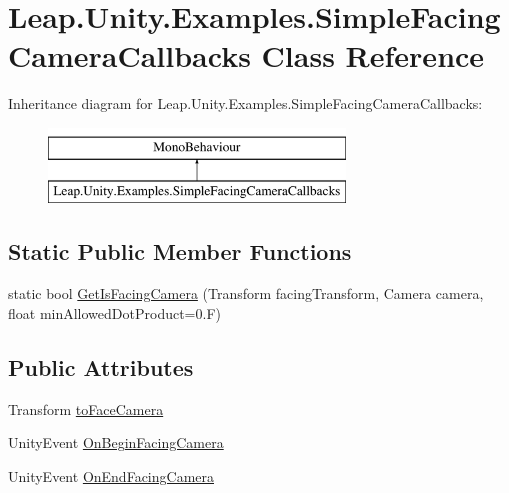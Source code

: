 \hypertarget{class_leap_1_1_unity_1_1_examples_1_1_simple_facing_camera_callbacks}{}\section{Leap.\+Unity.\+Examples.\+Simple\+Facing\+Camera\+Callbacks Class Reference}
\label{class_leap_1_1_unity_1_1_examples_1_1_simple_facing_camera_callbacks}
Inheritance diagram for Leap.\+Unity.\+Examples.\+Simple\+Facing\+Camera\+Callbacks\+:\begin{figure}[H]
\begin{center}
\leavevmode
\includegraphics[height=2.000000cm]{class_leap_1_1_unity_1_1_examples_1_1_simple_facing_camera_callbacks}
\end{center}
\end{figure}
\subsection*{Static Public Member Functions}
\begin{DoxyCompactItemize}
\item 
static bool \mbox{\hyperlink{class_leap_1_1_unity_1_1_examples_1_1_simple_facing_camera_callbacks_aa9eaccb99220ec261cde010db1856ae3}{Get\+Is\+Facing\+Camera}} (Transform facing\+Transform, Camera camera, float min\+Allowed\+Dot\+Product=0.\+F)
\end{DoxyCompactItemize}
\subsection*{Public Attributes}
\begin{DoxyCompactItemize}
\item 
Transform \mbox{\hyperlink{class_leap_1_1_unity_1_1_examples_1_1_simple_facing_camera_callbacks_a3ff7cc54db1b55f4f532941be64f0dbd}{to\+Face\+Camera}}
\item 
Unity\+Event \mbox{\hyperlink{class_leap_1_1_unity_1_1_examples_1_1_simple_facing_camera_callbacks_a8602a31f6fb142345dcc21569a102110}{On\+Begin\+Facing\+Camera}}
\item 
Unity\+Event \mbox{\hyperlink{class_leap_1_1_unity_1_1_examples_1_1_simple_facing_camera_callbacks_ac330d8b83831d418193b43e1472b1fc7}{On\+End\+Facing\+Camera}}
\end{DoxyCompactItemize}


